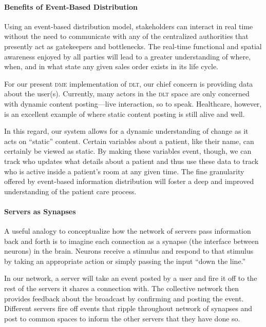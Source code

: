     \paragraph{Benefits of Event-Based Distribution}
    Using an event-based distribution model, stakeholders can interact in real time without the need to communicate with any of the centralized authorities that presently act as gatekeepers and bottlenecks. The real-time functional and spatial awareness enjoyed by all parties will lead to a greater understanding of where, when, and in what state any given sales order exists in its life cycle.%

    For our present \textsc{dme} implementation of \textsc{dlt}, our chief concern is providing data about the user(s). Currently, many actors in the \textsc{dlt} space are only concerned with dynamic content posting---live interaction, so to speak. Healthcare, however, is an excellent example of where static content posting is still alive and well.%

    In this regard, our system allows for a dynamic understanding of change as it acts on ``static'' content. Certain variables about a patient, like their name, can certainly be viewed as static. By making these variables event, though, we can track who updates what details about a patient and thus use these data to track who is active inside a patient's room at any given time. The fine granularity offered by event-based information distribution will foster a deep and improved understanding of the patient care process.%

    \paragraph{Servers as Synapses}
    A useful analogy to conceptualize how the network of servers pass information back and forth is to imagine each connection as a synapse (the interface between neurons) in the brain. Neurons receive a stimulus and respond to that stimulus by taking an appropriate action or simply passing the input ``down the line.''%

    In our network, a server will take an event posted by a user and fire it off to the rest of the servers it shares a connection with. The collective network then provides feedback about the broadcast by confirming and posting the event. Different servers fire off events that ripple throughout network of synapses and post to common spaces to inform the other servers that they have done so.%

